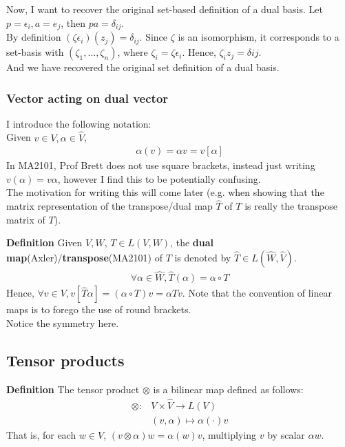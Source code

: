 \documentclass{article}
\begin{document}
Now, I want to recover the original set-based definition of a dual basis. Let $p=\epsilon_i, a=e_j$, then $pa=\delta_{ij}$.\\
By definition $(\zeta \epsilon_i)(z_j)=\delta_{ij}$. Since $\zeta$ is an isomorphism, it corresponds to a set-basis with $(\zeta_1,\dots,\zeta_n)$, where $\zeta_i=\zeta \epsilon_i$. Hence, $\zeta_iz_j=\delta{ij}$.\\
And we have recovered the original set definition of a dual basis.

\subsubsection{Vector acting on dual vector}
I introduce the following notation:\\
Given $v\in V, \alpha \in \hat{V}$,
\begin{align*}
	\alpha(v)=\alpha v=v[\alpha]
\end{align*}
In MA2101, Prof Brett does not use square brackets, instead just writing $v(\alpha)=v\alpha$, however I find this to be potentially confusing.\\
The motivation for writing this will come later (e.g. when showing that the matrix representation of the transpose/dual map $\hat{T}$ of $T$ is really the transpose matrix of $T$).

\textbf{Definition} Given $V, W$, $T\in L(V, W)$, the \textbf{dual map}(Axler)/\textbf{transpose}(MA2101) of $T$ is denoted by $\hat{T}\in L(\hat{W},\hat{V})$. 
\begin{align*}
	\forall \alpha \in \hat{W}, \hat{T}(\alpha)=\alpha \circ T
\end{align*}
Hence, $\forall v\in V, v[\hat{T}\alpha]=(\alpha \circ T)v=\alpha Tv$. Note that the convention of linear maps is to forego the use of round brackets.\\
Notice the symmetry here.

\subsection{Tensor products}
\textbf{Definition} The tensor product $\otimes$ is a bilinear map defined as follows:
\begin{align*}
	\otimes: &V \times \hat{V}\rightarrow L(V)\\
	&(v, \alpha) \mapsto \alpha(\cdot)v
\end{align*}
That is, for each $w\in V$, $(v\otimes \alpha)w=\alpha(w)v$, multiplying $v$ by scalar $\alpha w$.
\end{document}
